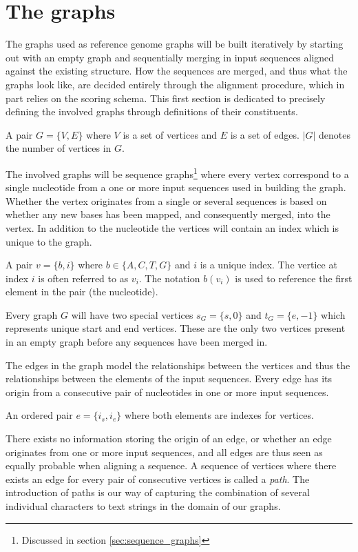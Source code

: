 \documentclass[thesis.tex]{subfiles}
\begin{document}
{\section{The graphs}
The graphs used as reference genome graphs will be built iteratively by starting out with an empty graph and sequentially merging in input sequences aligned against the existing structure. How the sequences are merged, and thus what the graphs look like, are decided entirely through the alignment procedure, which in part relies on the scoring schema. This first section is dedicated to precisely defining the involved graphs through definitions of their constituents. 
\clearpage
\begin{defn}
  A pair $G=\{V,E\}$ where $V$ is a set of vertices and $E$ is a set of edges. $|G|$ denotes the number of vertices in $G$.
\end{defn}
The involved graphs will be sequence graphs\footnote{Discussed in section \ref{sec:sequence_graphs}} where every vertex correspond to a single nucleotide from a one or more input sequences used in building the graph. Whether the vertex originates from a single or several sequences is based on whether any new bases has been mapped, and consequently merged, into the vertex. In addition to the nucleotide the vertices will contain an index which is unique to the graph. 
\begin{defn}
  A pair $v=\{b, i\}$ where $b \in \{A, C, T, G\}$ and $i$ is a unique index. The vertice at index $i$ is often referred to as $v_i$. The notation $b(v_i)$ is used to reference the first element in the pair (the nucleotide).
\end{defn}
Every graph $G$ will have two special vertices $s_G=\{s, 0\}$ and $t_G=\{e, -1\}$ which represents unique start and end vertices. These are the only two vertices present in an empty graph before any sequences have been merged in.\\
\par\noindent
The edges in the graph model the relationships between the vertices and thus the relationships between the elements of the input sequences. Every edge has its origin from a consecutive pair of nucleotides in one or more input sequences.
\begin{defn}
  An ordered pair $e=\{i_s, i_e\}$ where both elements are indexes for vertices. 
\end{defn}
There exists no information storing the origin of an edge, or whether an edge originates from one or more input sequences, and all edges are thus seen as equally probable when aligning a sequence. A sequence of vertices where there exists an edge for every pair of consecutive vertices is called a \textit{path}. The introduction of paths is our way of capturing the combination of several individual characters to text strings in the domain of our graphs.
}
\end{document}
